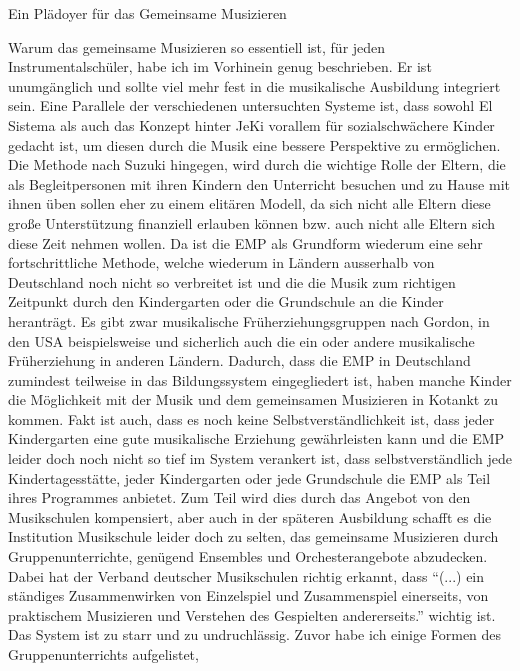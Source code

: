 Ein Plädoyer für das Gemeinsame Musizieren

Warum das gemeinsame Musizieren so essentiell ist, für jeden
Instrumentalschüler, habe ich im Vorhinein genug beschrieben. Er ist
unumgänglich und sollte viel mehr fest in die musikalische Ausbildung integriert
sein. Eine Parallele der verschiedenen untersuchten Systeme ist, dass sowohl El
Sistema als auch das Konzept hinter JeKi vorallem für sozialschwächere Kinder
gedacht ist, um diesen durch die Musik eine bessere Perspektive zu ermöglichen.
Die Methode nach Suzuki hingegen, wird durch die wichtige Rolle der Eltern, die
als Begleitpersonen mit ihren Kindern den Unterricht besuchen und zu Hause mit
ihnen üben sollen eher zu einem elitären Modell, da sich nicht alle Eltern diese
große Unterstützung finanziell erlauben können bzw. auch nicht alle Eltern sich
diese Zeit nehmen wollen. Da ist die EMP als Grundform wiederum eine sehr
fortschrittliche Methode, welche wiederum in Ländern ausserhalb von Deutschland
noch nicht so verbreitet ist und die die Musik zum richtigen Zeitpunkt durch den
Kindergarten oder die Grundschule an die Kinder heranträgt. Es gibt zwar
musikalische Früherziehungsgruppen nach Gordon, in den USA beispielsweise und
sicherlich auch die ein oder andere musikalische Früherziehung in anderen
Ländern. Dadurch, dass die EMP in Deutschland zumindest teilweise in das
Bildungssystem eingegliedert ist, haben manche Kinder die Möglichkeit mit der
Musik und dem gemeinsamen Musizieren in Kotankt zu kommen. Fakt ist auch,
dass es noch keine Selbstverständlichkeit ist, dass jeder Kindergarten eine gute
musikalische Erziehung gewährleisten kann und die EMP leider doch noch nicht so tief
im System verankert ist, dass selbstverständlich jede Kindertagesstätte, jeder
Kindergarten oder jede Grundschule die EMP als Teil ihres Programmes anbietet.
Zum Teil wird dies durch das Angebot von den Musikschulen kompensiert, aber auch
in der späteren Ausbildung schafft es die Institution Musikschule leider doch zu
selten, das gemeinsame Musizieren durch Gruppenunterrichte, genügend
Ensembles und Orchesterangebote abzudecken. Dabei hat der Verband deutscher
Musikschulen richtig erkannt, dass \enquote{(...) ein ständiges
Zusammenwirken von Einzelspiel und Zusammenspiel einerseits, von praktischem
Musizieren und Verstehen des Gespielten andererseits.} wichtig ist.
\autocite[22]{losert:die_kunst_zu_unterrichten} Das System ist zu starr und zu
undruchlässig. Zuvor habe ich einige Formen des Gruppenunterrichts aufgelistet,
